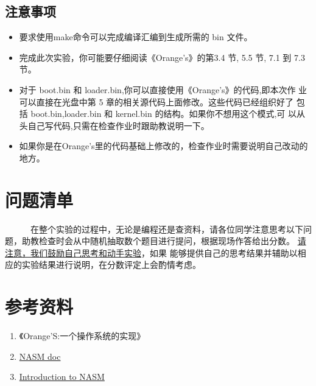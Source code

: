 \documentclass[a4paper]{article}
\begin{document}
\subsection{注意事项}
	\begin{itemize}
		\item 要求使用make命令可以完成编译汇编到生成所需的 bin 文件。
		\item 完成此次实验，你可能要仔细阅读《Orange’s》的第3.4 节, 5.5 节, 7.1 到 7.3 节。
		\item 对于 boot.bin 和 loader.bin,你可以直接使用《Orange’s》的代码,即本次作
业可以直接在光盘中第 5 章的相关源代码上面修改。这些代码已经组织好了 包括 boot.bin,loader.bin 和 kernel.bin 的结构。如果你不想用这个模式,可 以从头自己写代码,只需在检查作业时跟助教说明一下。
		\item 如果你是在Orange's里的代码基础上修改的，检查作业时需要说明自己改动的地方。
	\end{itemize}

\section{问题清单}
~~~~~~在整个实验的过程中，无论是编程还是查资料，请各位同学注意思考以下问题，助教检查时会从中随机抽取数个题目进行提问，根据现场作答给出分数。
\underline{请注意，我们鼓励自己思考和动手实验}，如果
能够提供自己的思考结果并辅助以相应的实验结果进行说明，在分数评定上会酌情考虑。


\section{参考资料}
	\begin{enumerate}
		\item 《Orange'S:一个操作系统的实现》
		\item \href{http://www.nasm.us/doc/} {NASM doc}
		\item \href{http://jingliu.me/my_files/nasm.pdf}{Introduction to NASM}
	\end{enumerate}
\end{document}
